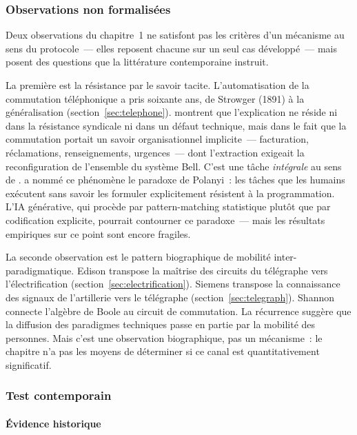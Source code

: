 \subsubsection{Observations non formalisées}

Deux observations du chapitre~1 ne satisfont pas les critères d'un mécanisme au sens du protocole~--- elles reposent chacune sur un seul cas développé~--- mais posent des questions que la littérature contemporaine instruit.

La première est la résistance par le savoir tacite. L'automatisation de la commutation téléphonique a pris soixante ans, de Strowger (1891) à la généralisation (section~\ref{sec:telephone}). \textcite{feigenbaum_organizational_2024} montrent que l'explication ne réside ni dans la résistance syndicale ni dans un défaut technique, mais dans le fait que la commutation portait un savoir organisationnel implicite~--- facturation, réclamations, renseignements, urgences~--- dont l'extraction exigeait la reconfiguration de l'ensemble du système Bell. C'est une tâche \emph{intégrale} au sens de \textcite{ulrich_role_1995}. \textcite{autor_polanyi_2014} a nommé ce phénomène le \og paradoxe de Polanyi\fg{}~: les tâches que les humains exécutent sans savoir les formuler explicitement résistent à la programmation. L'IA générative, qui procède par pattern-matching statistique plutôt que par codification explicite, pourrait contourner ce paradoxe~--- mais les résultats empiriques sur ce point sont encore fragiles.

La seconde observation est le pattern biographique de mobilité inter-paradigmatique. Edison transpose la maîtrise des circuits du télégraphe vers l'électrification (section~\ref{sec:electrification}). Siemens transpose la connaissance des signaux de l'artillerie vers le télégraphe (section~\ref{sec:telegraph}). Shannon connecte l'algèbre de Boole au circuit de commutation. La récurrence suggère que la diffusion des paradigmes techniques passe en partie par la mobilité des personnes. Mais c'est une observation biographique, pas un mécanisme~: le chapitre n'a pas les moyens de déterminer si ce canal est quantitativement significatif.


\subsubsection{Test contemporain}

\paragraph{Évidence historique}

